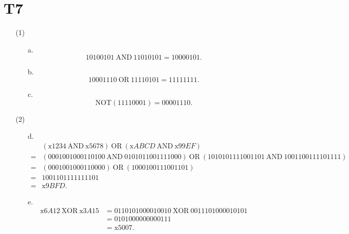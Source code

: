 \documentclass{article}
\begin{document}
\section*{T7}
    \begin{enumerate}
        \item [(1)]
        \begin{enumerate}
            \item [a.]
            \[
                10100101\ \mbox{AND}\ 11010101= 10000101.
            \]
            \item [b.]
            \[
                10001110\ \mbox{OR}\ 11110101=1111 1111.
            \]
            \item [c.]
            \[
                \mbox{NOT}(11110001)=00001110.
            \]
        \end{enumerate}
        \item [(2)]
        \begin{enumerate}
            \item [d.]
            \begin{align*}
                &(\mbox{x}1234\ \mbox{AND}\ \mbox{x}5678)\ \mbox{OR}\ (\mbox{x}ABCD\ \mbox{AND}\ \mbox{x}99EF)\\
                =&(0001 0010 0011 0100\ \mbox{AND}\ 0101 0110 0111 1000)\ \mbox{OR}\ (1010 1011 1100 1101\ \mbox{AND}\ 1001 1001 1110 1111)\\
                =&(0001 0010 0011 0000)\ \mbox{OR}\ (1000 1001 1100 1101)\\
                =& 1001 1011 1111 1101\\
                =& \mbox{x}9BFD.
            \end{align*}
            \item [e.]
            \begin{align*}
                \mbox{x}6A12\ \mbox{XOR}\ \mbox{x}3A15
                &=0110 1010 0001 0010\ \mbox{XOR}\ 0011 1010 0001 0101\\
                &=0101 0000 0000 0111\\
                &=\mbox{x}5007.
            \end{align*}
        \end{enumerate}
    \end{enumerate}
\clearpage
\end{document}
